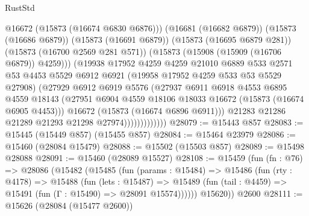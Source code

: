 \begin{lexlean}{RustStd}
\begin{coremodule}
                              @16672
                              (@15873 (@16674 @6830 @6876)))
                            (@16681 (@16682 @6879))
                            (@15873 (@16686 @6879))
                            (@15873 (@16691 @6879))
                            (@15873 (@16695 @6879 @281))
                            (@15873 (@16700 @2569 @281 @571))
                            (@15873 (@15908 (@15909 (@16706 @6879)) @4259)))
                          (@19938
                            @17952
                            @4259
                            @4259
                            @21010
                            @6889
                            @533
                            @2571
                            @53
                            @4453
                            @5529
                            @6912
                            @6921
                            (@19958 @17952 @4259 @533 @53 @5529 @27908)
                            (@27929
                              @6912
                              @6919
                              @5576
                              (@27937
                                @6911
                                @6918
                                @4553
                                @6895
                                @4559
                                @18143
                                (@27951
                                  @6904
                                  @4559
                                  @18106
                                  @18033
                                  @16672
                                  (@15873 (@16674 @6905 @4453)))
                                @16672
                                (@15873 (@16674 @6896 @6911)))
                              @21283
                              @21286
                              @21289
                              @21293
                              @21298
                              @27974)))))))))))))
@28079 := @15443 @857
@28083 := @15445 (@15449 @857) (@15455 @857)
@28084 := @15464 @23979
@28086 := @15460 (@28084 @15479)
@28088 := @15502 (@15503 @857)
@28089 := @15498 @28088
@28091 := @15460 (@28089 @15527)
@28108 := @15459
    (fun (fn : @76) =>
    @28086
      (@15482
        (@15485
          (fun (params : @15484) =>
          @15486
            (fun (rty : @4178) =>
            @15488
              (fun (lets : @15487) =>
              @15489 (fun (tail : @4459) => @15491 (fun (Γ : @15490) => @28091 @15574))))))
        @15620))
    @2600
@28111 := @15626 (@28084 (@15477 @2600))

\end{coremodule}
\end{lexlean}
